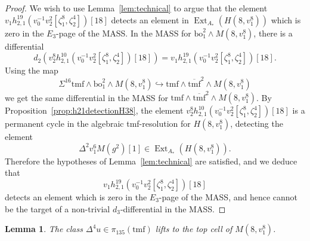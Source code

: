 \documentclass[10pt]{amsart}
\newcommand{\ul}[1]{\underline{#1}}
\newcommand{\br}[1]{\overline{#1}}
\newcommand{\tmf}{\mathrm{tmf}}
\newcommand{\bo}{\mathrm{bo}}
\newcommand{\bou}{\ul{\bo}}
\newtheorem{lem}[equation]{Lemma}
\theoremstyle{definition}
\numberwithin{equation}{section}
\numberwithin{figure}{section}
\DeclareMathOperator{\Ext}{Ext}
\begin{document}
\begin{proof}
We wish to use Lemma~\ref{lem:technical} to argue that the element 
$v_1 h_{2,1}^{19}(v_0^{-1}v_2^2[\zeta_1^8,\zeta_2^4])[18]$ detects an element in $\Ext_{A_*}(H(8,v_1^8))$ which is zero in the $E_3$-page of the MASS.
In the MASS for $\bo_1^2 \wedge M(8,v_1^8)$, there is a differential
$$ d_2(v_2^8 h^{10}_{2,1}(v_0^{-1}v_2^2[\zeta_1^8,\zeta_2^4])[18]) = 
v_1 h_{2,1}^{19}(v_0^{-1}v_2^2[\zeta_1^8,\zeta_2^4])[18]. $$
Using the map
$$ \Sigma^{16}\tmf \wedge \bo^2_1 \wedge M(8,v_1^8) \hookrightarrow \tmf \wedge \br{\tmf}^2 \wedge M(8,v_1^8) $$
we get the same differential in the MASS for $\tmf \wedge \br{\tmf}^2 \wedge M(8,v_1^8)$.
By Proposition~\ref{prop:h21detectionH38}, the element $v_2^8 h^{10}_{2,1}(v_0^{-1}v_2^2[\zeta_1^8,\zeta_2^4])[18]$ is a permanent cycle in the algebraic tmf-resolution for $H(8,v_1^8)$, detecting the element
$$ \Delta^2 v_1^6 M(g^2)[1] \in \Ext_{A_*}(H(8,v_1^8)). $$
Therefore the hypotheses of Lemma~\ref{lem:technical} are satisfied, and we deduce that 
$$v_1 h_{2,1}^{19}(v_0^{-1}v_2^2[\zeta_1^8,\zeta_2^4])[18]$$ 
detects an element which is zero in the $E_3$-page of the MASS, and hence cannot be the target of a non-trivial $d_3$-differential in the MASS.
\end{proof}




\begin{lem}\label{Lem:v216uLift}
The class $\Delta^4 u \in \pi_{135}(\tmf)$ lifts to the top cell of $M(8,v_1^8)$. 
\end{lem}
\end{document}

